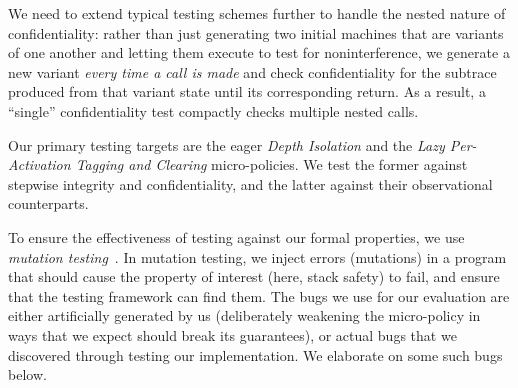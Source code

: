 \documentclass[10pt,conference]{ieeetran}%
\theoremstyle{definition}
\begin{document}
%
%
%
We need to extend typical testing schemes further to handle the nested
nature of confidentiality: rather than just generating two
initial machines that are variants of one another and letting them
execute to test for noninterference, we generate a new variant
{\em every time a call is made} and check confidentiality for the
subtrace produced from that variant state until its corresponding
return. As a result, a ``single'' confidentiality test compactly
checks multiple nested calls.

Our primary testing targets are the eager {\em Depth Isolation}
and the {\em Lazy Per-Activation Tagging and Clearing} micro-policies.
We test the former against stepwise integrity and confidentiality, and
the latter against their observational counterparts.

To ensure the effectiveness of testing against our formal properties, we
use {\em mutation testing}~\cite{JiaH11}. In mutation testing, we inject errors
(mutations) in a program that should cause the property of interest (here,
stack safety) to fail, and ensure that the testing framework can find
them. The bugs we use for our evaluation are either artificially generated
by us (deliberately weakening the micro-policy in ways that we expect
should break its guarantees), or actual bugs that we discovered through
testing our implementation. We elaborate on some such bugs below.
\end{document}

